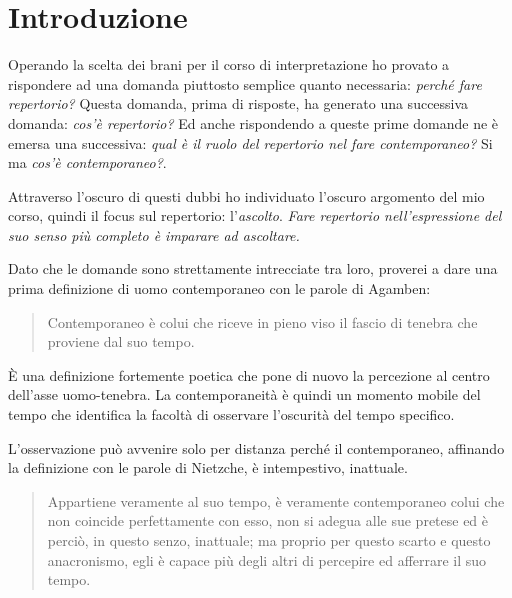 

\chapter*{Introduzione}

Operando la scelta dei brani per il corso di interpretazione ho provato a rispondere ad una domanda piuttosto semplice quanto necessaria: \emph{perché fare repertorio?} Questa domanda, prima di risposte, ha generato una successiva domanda: \emph{cos'è repertorio?} Ed anche rispondendo a queste prime domande ne è emersa una successiva: \emph{qual è il ruolo del repertorio nel fare contemporaneo?} Si ma \emph{cos'è contemporaneo?}.

Attraverso l'oscuro di questi dubbi ho individuato l'oscuro argomento del mio corso, quindi il focus sul repertorio: l'\emph{ascolto}. \emph{Fare repertorio nell'espressione del suo senso pi\`u completo \`e imparare ad ascoltare.}

Dato che le domande sono strettamente intrecciate tra loro, proverei a dare una prima definizione di uomo contemporaneo con le parole di Agamben:

\begin{quote}
	Contemporaneo è colui che riceve in pieno viso il fascio di tenebra che proviene dal suo tempo.
\end{quote}

È una definizione fortemente poetica che pone di nuovo la percezione al centro dell'asse uomo-tenebra. La contemporaneità è quindi un momento mobile del tempo che identifica la facoltà di osservare l'oscurità del tempo specifico.

L'osservazione può avvenire solo per distanza perché il contemporaneo, affinando la definizione con le parole di Nietzche, è intempestivo, inattuale.

\begin{quote}
	Appartiene veramente al suo tempo, è veramente contemporaneo colui che non coincide perfettamente con esso, non si adegua alle sue pretese ed è perciò, in questo senzo, inattuale; ma proprio per questo scarto e questo anacronismo, egli è capace pi\`u degli altri di percepire ed afferrare il suo tempo.
\end{quote}

